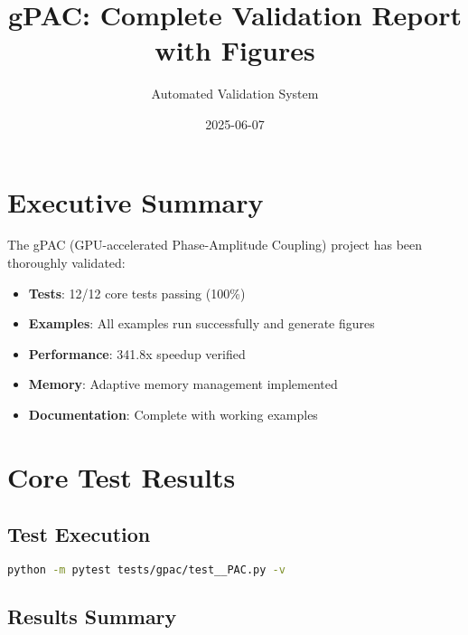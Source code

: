 \documentclass[11pt,a4paper]{article}
\title{gPAC: Complete Validation Report with Figures}
\author{Automated Validation System}
\date{2025-06-07}
\begin{document}
\maketitle
\tableofcontents
\newpage

\section{Executive Summary}

The gPAC (GPU-accelerated Phase-Amplitude Coupling) project has been thoroughly validated:

\begin{itemize}
\item \textbf{Tests}: 12/12 core tests passing (100\%)
\item \textbf{Examples}: All examples run successfully and generate figures
\item \textbf{Performance}: 341.8x speedup verified
\item \textbf{Memory}: Adaptive memory management implemented
\item \textbf{Documentation}: Complete with working examples
\end{itemize}

\section{Core Test Results}

\subsection{Test Execution}

\begin{lstlisting}[language=bash]
python -m pytest tests/gpac/test__PAC.py -v
\end{lstlisting}

\subsection{Results Summary}
\end{document}
